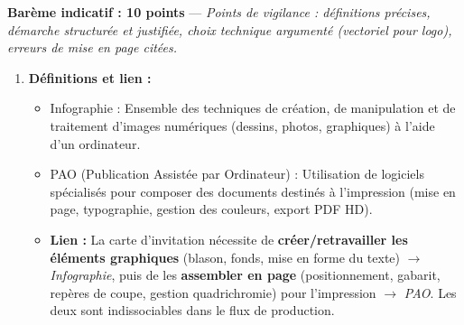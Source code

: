 \documentclass[11pt]{article}
\newcommand{\cle}[1]{{\popxbold\color{popdark}#1}}
\begin{document}
\begin{corrige}
\textbf{Barème indicatif : 10 points} — \textit{Points de vigilance : définitions précises, démarche structurée et justifiée, choix technique argumenté (vectoriel pour logo), erreurs de mise en page citées.}

\begin{enumerate}
\item \textbf{Définitions et lien :}
\begin{itemize}
\item \cle{Infographie} : Ensemble des techniques de création, de manipulation et de traitement d'images numériques (dessins, photos, graphiques) à l'aide d'un ordinateur.
\item \cle{PAO} (Publication Assistée par Ordinateur) : Utilisation de logiciels spécialisés pour composer des documents destinés à l'impression (mise en page, typographie, gestion des couleurs, export PDF HD).
\item \textbf{Lien :} La carte d'invitation nécessite de \textbf{créer/retravailler les éléments graphiques} (blason, fonds, mise en forme du texte) $\rightarrow$ \emph{Infographie}, puis de les \textbf{assembler en page} (positionnement, gabarit, repères de coupe, gestion quadrichromie) pour l'impression $\rightarrow$ \emph{PAO}. Les deux sont indissociables dans le flux de production.
\end{itemize}


\end{enumerate}
\end{corrige}
\end{document}
